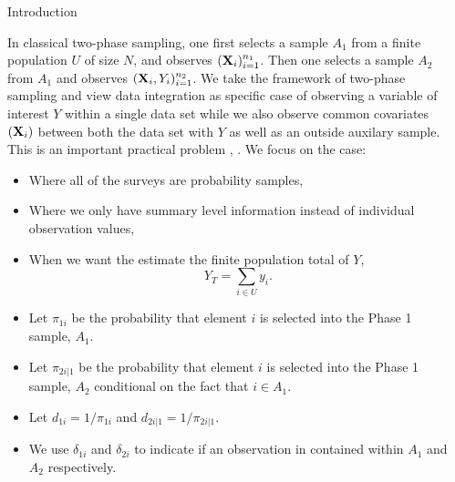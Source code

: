 \documentclass[final]{beamer}
\newlength{\sepwidth}
\newlength{\colwidth}
\newcommand{\separatorcolumn}{\begin{column}{\sepwidth}\end{column}}
\begin{document}
\begin{frame}[t]
\begin{columns}[t]
\separatorcolumn

\begin{column}{\colwidth}

  \begin{block}{Introduction}

    In classical two-phase sampling, one first selects a sample $A_1$ from a
    finite population $U$ of size $N$, and observes $({\bf X}_i)_{i = 1}^{n_1}$.
    Then one selects a sample $A_2$ from $A_1$ and observes 
    $({\bf X}_i, Y_i)_{i = 1}^{n_2}$. We take the
    framework of two-phase sampling and view data integration as specific case
    of observing a variable of interest $Y$ within a single data set while we
    also observe common covariates $({\bf X}_i)$ between both the data set with
    $Y$ as well as an outside auxilary sample. This is an important practical
    problem \cite{yang2020statistical}, 
    \cite{dagdoug2023model}. We focus on the case:

    \begin{itemize}
      \item Where all of the surveys are probability samples, 
      \item Where we only have summary level information instead of individual
        observation values,
      \item When we want the estimate the finite population total of $Y$,
        $$Y_T = \sum_{i \in U} y_i.$$
    \end{itemize}


    \begin{itemize}
      \item Let $\pi_{1i}$ be the probability that element $i$ is selected into
        the Phase 1 sample, $A_1$.
      \item Let $\pi_{2i|1}$ be the probability that element $i$ is selected into
        the Phase 1 sample, $A_2$ conditional on the fact that $i \in A_1$.
      \item Let $d_{1i} = 1 / \pi_{1i}$ and $d_{2i|1} = 1 / \pi_{2i|1}$.
      \item We use $\delta_{1i}$ and $\delta_{2i}$ to indicate if an observation
        in contained within $A_1$ and $A_2$ respectively.
    \end{itemize}

  \end{block}


\end{column}
\end{columns}
\end{frame}
\end{document}
